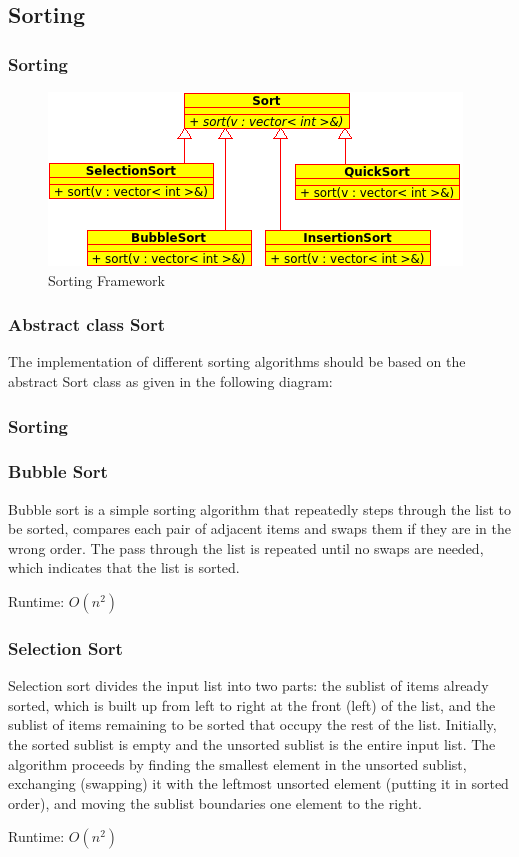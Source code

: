 \subsection{Sorting}

\begin{frame}[fragile]
\frametitle{Sorting}

\begin{figure}[h]
\centering\includegraphics[scale=0.7]{img/sorting.png}
\caption{Sorting Framework}
\end{figure}

\subsubsection{Abstract class Sort}
The implementation of different sorting algorithms should be based on
the abstract Sort class as given in the following diagram:

\end{frame}

\begin{frame}[fragile]
\frametitle{Sorting}
{\small

}

\end{frame}

\begin{frame}[fragile]
\frametitle{Bubble Sort}
{\tiny
Bubble sort is a simple sorting algorithm that repeatedly steps through the list to be sorted,
compares each pair of adjacent items and swaps them if they are in the wrong order.
The pass through the list is repeated until no swaps are needed, which indicates that the
list is sorted. 

Runtime: $O(n^2)$
}
\end{frame}

\begin{frame}[fragile]
\frametitle{Selection Sort}
{\tiny
Selection sort divides the input list into two parts: the sublist of items already sorted,
which is built up from left to right at the front (left) of the list, and the sublist of items
remaining to be sorted that occupy the rest of the list. Initially, the sorted sublist is empty and the
unsorted sublist is the entire input list. The algorithm proceeds by finding the smallest element in the
unsorted sublist, exchanging (swapping) it with the leftmost unsorted element (putting it in sorted order),
and moving the sublist boundaries one element to the right.

Runtime: $O(n^2)$
}
\end{frame}

